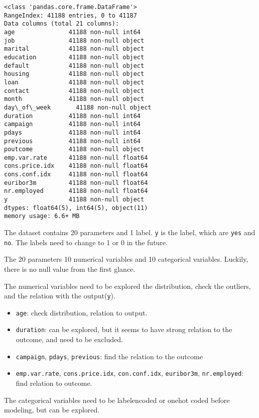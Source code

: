 \documentclass[11pt]{article}
\providecommand{\tightlist}{%
      \setlength{\itemsep}{0pt}\setlength{\parskip}{0pt}}
\begin{document}
    \begin{Verbatim}[commandchars=\\\{\}]
<class 'pandas.core.frame.DataFrame'>
RangeIndex: 41188 entries, 0 to 41187
Data columns (total 21 columns):
age               41188 non-null int64
job               41188 non-null object
marital           41188 non-null object
education         41188 non-null object
default           41188 non-null object
housing           41188 non-null object
loan              41188 non-null object
contact           41188 non-null object
month             41188 non-null object
day\_of\_week       41188 non-null object
duration          41188 non-null int64
campaign          41188 non-null int64
pdays             41188 non-null int64
previous          41188 non-null int64
poutcome          41188 non-null object
emp.var.rate      41188 non-null float64
cons.price.idx    41188 non-null float64
cons.conf.idx     41188 non-null float64
euribor3m         41188 non-null float64
nr.employed       41188 non-null float64
y                 41188 non-null object
dtypes: float64(5), int64(5), object(11)
memory usage: 6.6+ MB

    \end{Verbatim}

    The dataset contains 20 parameters and 1 label. \texttt{y} is the label,
which are \texttt{yes} and \texttt{no}. The labels need to change to 1
or 0 in the future.

The 20 parameters 10 numerical variables and 10 categorical variables.
Luckily, there is no null value from the first glance.

The numerical variables need to be explored the distribution, check the
outliers, and the relation with the output(\texttt{y}).

\begin{itemize}
\tightlist
\item
  \texttt{age}: check distribution, relation to output.
\item
  \texttt{duration}: can be explored, but it seems to have strong
  relation to the outcome, and need to be excluded.
\item
  \texttt{campaign}, \texttt{pdays}, \texttt{previous}: find the
  relation to the outcome
\item
  \texttt{emp.var.rate}, \texttt{cons.price.idx}, \texttt{con.conf.idx},
  \texttt{euribor3m}, \texttt{nr.employed}: find relation to outcome.
\end{itemize}

The categorical variables need to be labelencoded or onehot coded before
modeling, but can be explored.
\end{document}
